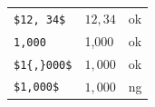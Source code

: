 \documentclass[preview]{standalone}
\newcommand{\tA}[1]{\textcolor{cA}{#1}}
\newcommand{\tD}[1]{\textcolor{cD}{#1}}
\begin{document}
\begin{table}[H]
	\centering
	\begin{tabular}{lll}
		\verb|$12, 34$|  & $12, 34$  & \tA{ok} \\
		\verb|1,000|     & 1,000     & \tA{ok} \\
		\verb|$1{,}000$| & $1{,}000$ & \tA{ok} \\
		\verb|$1,000$|   & $1,000$   & \tD{ng} \\
	\end{tabular}
\end{table}
\end{document}
